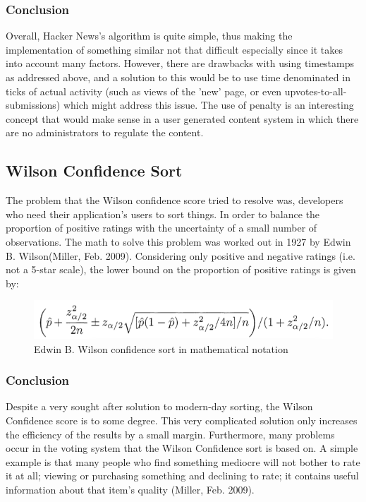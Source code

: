 \subsubsection {Conclusion}
Overall, Hacker News's algorithm is quite simple, thus making the implementation of something similar not that difficult especially since it takes into account many factors. However, there are drawbacks with using timestamps as addressed above, and a solution to this would be to use time denominated in ticks of actual activity (such as views of the 'new' page, or even upvotes-to-all-submissions) which might address this issue.
The use of penalty is an interesting concept that would make sense in a user generated content system in which there are no administrators to regulate the content.

\subsection {Wilson Confidence Sort}
The problem that the Wilson confidence score tried to resolve was, developers who need their application's users to sort things. In order to balance the proportion of positive ratings with the uncertainty of a small number of observations. The math to solve this problem was worked out in 1927 by Edwin B. Wilson(Miller, Feb. 2009). Considering only positive and negative ratings (i.e. not a 5-star scale), the lower bound on the proportion of positive ratings is given by:

\begin{figure} [!htb]
  \centering
	\includegraphics[scale=0.5]{Figures/wilson_confidence}
\caption{Edwin B. Wilson confidence sort in mathematical notation}
\end{figure}

\subsubsection{Conclusion}
Despite a very sought after solution to modern-day sorting, the Wilson Confidence score is to some degree. This very complicated solution only increases the efficiency of the results by a small margin. Furthermore, many problems occur in the voting system that the Wilson Confidence sort is based on. A simple example is that many people who find something mediocre will not bother to rate it at all; viewing or purchasing something and declining to rate; it contains useful information about that item's quality (Miller, Feb. 2009).

